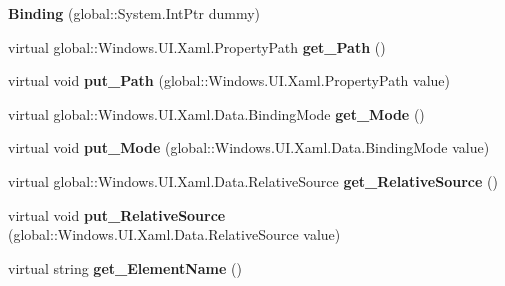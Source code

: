 \begin{DoxyCompactItemize}
{\bfseries Binding} (global\+::\+System.\+Int\+Ptr dummy)
\item 
\mbox{\label{class_windows_1_1_u_i_1_1_xaml_1_1_data_1_1_binding_a3670a1efb4d8824b1bc00bd91af01fc2}} 
virtual global\+::\+Windows.\+U\+I.\+Xaml.\+Property\+Path {\bfseries get\+\_\+\+Path} ()
\item 
\mbox{\label{class_windows_1_1_u_i_1_1_xaml_1_1_data_1_1_binding_a9f8d22b6891219f8db424a49a91ff24a}} 
virtual void {\bfseries put\+\_\+\+Path} (global\+::\+Windows.\+U\+I.\+Xaml.\+Property\+Path value)
\item 
\mbox{\label{class_windows_1_1_u_i_1_1_xaml_1_1_data_1_1_binding_ab0c392cb49f178e29a63d12a683e2c4f}} 
virtual global\+::\+Windows.\+U\+I.\+Xaml.\+Data.\+Binding\+Mode {\bfseries get\+\_\+\+Mode} ()
\item 
\mbox{\label{class_windows_1_1_u_i_1_1_xaml_1_1_data_1_1_binding_abc7d75756c9f93a8ec488cecb97265c5}} 
virtual void {\bfseries put\+\_\+\+Mode} (global\+::\+Windows.\+U\+I.\+Xaml.\+Data.\+Binding\+Mode value)
\item 
\mbox{\label{class_windows_1_1_u_i_1_1_xaml_1_1_data_1_1_binding_ac23f4899bbf0de1eaba1d8fc24e9f7c3}} 
virtual global\+::\+Windows.\+U\+I.\+Xaml.\+Data.\+Relative\+Source {\bfseries get\+\_\+\+Relative\+Source} ()
\item 
\mbox{\label{class_windows_1_1_u_i_1_1_xaml_1_1_data_1_1_binding_a9e13fc7038d328684876c114c0262cd2}} 
virtual void {\bfseries put\+\_\+\+Relative\+Source} (global\+::\+Windows.\+U\+I.\+Xaml.\+Data.\+Relative\+Source value)
\item 
\mbox{\label{class_windows_1_1_u_i_1_1_xaml_1_1_data_1_1_binding_a93680aa9f018dd4f75ac7515c0a00ebf}} 
virtual string {\bfseries get\+\_\+\+Element\+Name} ()
\item 
\mbox{\label{class_windows_1_1_u_i_1_1_xaml_1_1_data_1_1_binding_aabd010dd96a55bf922196a78fe1ad2ed}} 

\end{DoxyCompactItemize}
